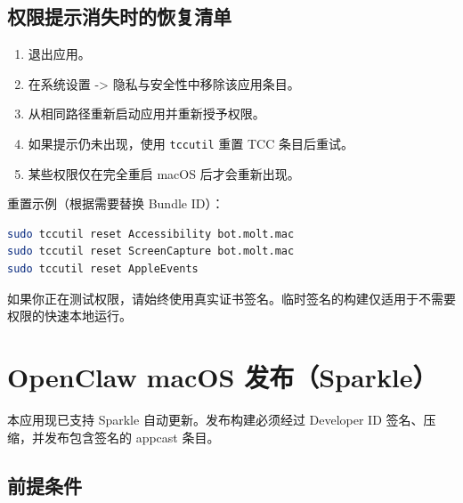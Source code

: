 \subsection{权限提示消失时的恢复清单}


\begin{enumerate}
  \item 退出应用。
  \item 在系统设置 -> 隐私与安全性中移除该应用条目。
  \item 从相同路径重新启动应用并重新授予权限。
  \item 如果提示仍未出现，使用 \texttt{tccutil} 重置 TCC 条目后重试。
  \item 某些权限仅在完全重启 macOS 后才会重新出现。
\end{enumerate}


重置示例（根据需要替换 Bundle ID）：

\begin{lstlisting}[language=bash]
sudo tccutil reset Accessibility bot.molt.mac
sudo tccutil reset ScreenCapture bot.molt.mac
sudo tccutil reset AppleEvents
\end{lstlisting}


如果你正在测试权限，请始终使用真实证书签名。临时签名的构建仅适用于不需要权限的快速本地运行。


\clearpage

\section{OpenClaw macOS 发布（Sparkle）}


本应用现已支持 Sparkle 自动更新。发布构建必须经过 Developer ID 签名、压缩，并发布包含签名的 appcast 条目。

\subsection{前提条件}


